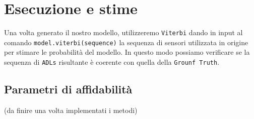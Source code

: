 \documentclass[12pt, a4paper]{scrartcl}
\begin{document}
\section*{Esecuzione e stime}

Una volta generato il nostro modello, utilizzeremo \texttt{Viterbi} dando in input al comando \texttt{model.viterbi(sequence)} la sequenza di sensori utilizzata in origine per stimare le probabilità del modello. In questo modo possiamo verificare se la sequenza di \texttt{ADLs} risultante è coerente con quella della \texttt{Grounf Truth}.

\subsection*{Parametri di affidabilità}
(da finire una volta implementati i metodi)
\end{document}
